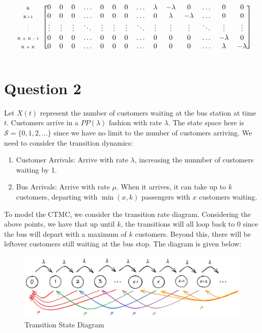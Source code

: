 \documentclass[12pt]{article}
\newcommand{\matindexx}[1]{\mbox{\tiny#1}}%
\begin{document}
\begin{equation*}
\begin{blockarray}{ccccccccccccccc}
\begin{block}{c[cccccccccccccc]}
            \matindexx{K} & 0 & 0 & 0 & \dots & 0 & 0 & 0 & \dots & \lambda & -\lambda & 0 & \dots & 0 & 0 \\
            \matindexx{K+1} & 0 & 0 & 0 & \dots & 0 & 0 & 0 & \dots & 0 & \lambda & -\lambda & \dots & 0 & 0 \\
            \matindexx{\vdots} & \vdots & \vdots & \vdots & \ddots & \vdots & \vdots & \vdots & \ddots & \vdots & \vdots & \vdots & \ddots & \vdots & \vdots \\
            \matindexx{R + K - 1} & 0 & 0 & 0 & \dots & 0 & 0 & 0 & \dots & 0 & 0 & 0 & \dots & -\lambda & 0 \\
            \matindexx{R + K} & 0 & 0 & 0 & \dots & 0 & 0 & 0 & \dots & 0 & 0 & 0 & \dots & \lambda & -\lambda \\
        \end{block}
    \end{blockarray}
\end{equation*}

\section*{Question 2}

Let $X(t)$ represent the number of customers waiting at the bus station at time $t$. Customers arrive in a $PP(\lambda)$ fashion with rate $\lambda$. The state space here is $\mathcal{S} = \{0,1,2,\dots\}$ since we have no limit to the number of customers arriving. We need to consider the transition dynamics: \begin{enumerate}
    \item Customer Arrivals: Arrive with rate $\lambda$, increasing the nunmber of customers waiting by 1. 
    \item Bus Arrivals: Arrive with rate $\mu$. When it arrives, it can take up to $k$ customers, departing with $\min (x,k)$ passengers with $x$ customers waiting. 
\end{enumerate} 

\noindent To model the CTMC, we consider the transition rate diagram. Considering the above points, we have that up until $k$, the transitions will all loop back to $0$ since the bus will depart with a maximum of $k$ customers. Beyond this, there will be leftover customers still waiting at the bus stop. The diagram is given below: 

\begin{figure}[H]
    \centering
    \includegraphics[width=\textwidth]{Images/Q2.png}
    \caption{Transition State Diagram}
    \label{fig:2-tsd}
\end{figure} 
\end{document}
